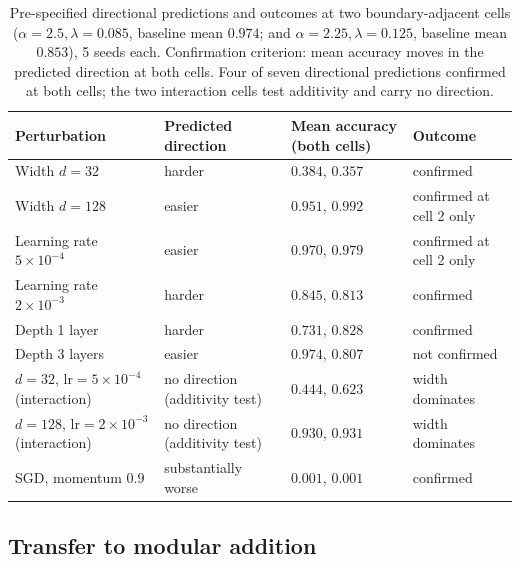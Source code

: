 \documentclass[11pt]{article}
\begin{document}
\begin{table}[t]
\centering
\small
\caption{Pre-specified directional predictions and outcomes at two boundary-adjacent cells ($\alpha{=}2.5,\lambda{=}0.085$, baseline mean $0.974$; and $\alpha{=}2.25,\lambda{=}0.125$, baseline mean $0.853$), 5 seeds each. Confirmation criterion: mean accuracy moves in the predicted direction at both cells. Four of seven directional predictions confirmed at both cells; the two interaction cells test additivity and carry no direction.}
\label{tab:robustness}
\begin{tabular}{@{}p{3.3cm}p{2.3cm}p{2.7cm}p{2.6cm}@{}}
\toprule
Perturbation & Predicted direction & Mean accuracy (both cells) & Outcome \\
\midrule
Width $d{=}32$ & harder & $0.384$, $0.357$ & confirmed \\
Width $d{=}128$ & easier & $0.951$, $0.992$ & confirmed at cell 2 only \\
Learning rate $5\times10^{-4}$ & easier & $0.970$, $0.979$ & confirmed at cell 2 only \\
Learning rate $2\times10^{-3}$ & harder & $0.845$, $0.813$ & confirmed \\
Depth 1 layer & harder & $0.731$, $0.828$ & confirmed \\
Depth 3 layers & easier & $0.974$, $0.807$ & not confirmed \\
$d{=}32$, lr$=5\times10^{-4}$ (interaction) & no direction (additivity test) & $0.444$, $0.623$ & width dominates \\
$d{=}128$, lr$=2\times10^{-3}$ (interaction) & no direction (additivity test) & $0.930$, $0.931$ & width dominates \\
SGD, momentum $0.9$ & substantially worse & $0.001$, $0.001$ & confirmed \\
\bottomrule
\end{tabular}
\end{table}

\subsection{Transfer to modular addition}
\label{sec:results-modadd}
\end{document}
